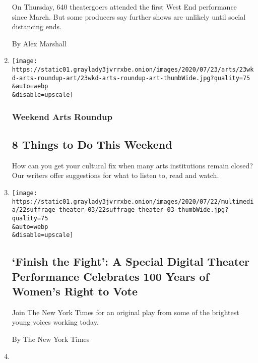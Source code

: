 \begin{enumerate}
  On Thursday, 640 theatergoers attended the first West End performance
  since March. But some producers say further shows are unlikely until
  social distancing ends.

  By Alex Marshall
\item
  \href{/2020/07/23/arts/things-to-do-weekend-coronavirus.html}{}

  \texttt{[image: https://static01.graylady3jvrrxbe.onion/images/2020/07/23/arts/23wkd-arts-roundup-art/23wkd-arts-roundup-art-thumbWide.jpg?quality=75\\\&auto=webp\\\&disable=upscale]}

  \hypertarget{weekend-arts-roundup}{%
  \subsubsection{Weekend Arts Roundup}\label{weekend-arts-roundup}}

  \hypertarget{8-things-to-do-this-weekend}{%
  \subsection{8 Things to Do This
  Weekend}\label{8-things-to-do-this-weekend}}

  How can you get your cultural fix when many arts institutions remain
  closed? Our writers offer suggestions for what to listen to, read and
  watch.
\item
  \href{/2020/07/23/theater/finish-the-fight-suffrage-centennial-performance.html}{}

  \texttt{[image: https://static01.graylady3jvrrxbe.onion/images/2020/07/22/multimedia/22suffrage-theater-03/22suffrage-theater-03-thumbWide.jpg?quality=75\\\&auto=webp\\\&disable=upscale]}

  \hypertarget{finish-the-fight-a-special-digital-theater-performance-celebrates-100-years-of-womens-right-to-vote}{%
  \subsection{`Finish the Fight': A Special Digital Theater Performance
  Celebrates 100 Years of Women's Right to
  Vote}\label{finish-the-fight-a-special-digital-theater-performance-celebrates-100-years-of-womens-right-to-vote}}

  Join The New York Times for an original play from some of the
  brightest young voices working today.

  By The New York Times
\item
  \href{/2020/07/23/theater/manual-cinema-puppets-retrospective.html}{}


\end{enumerate}
